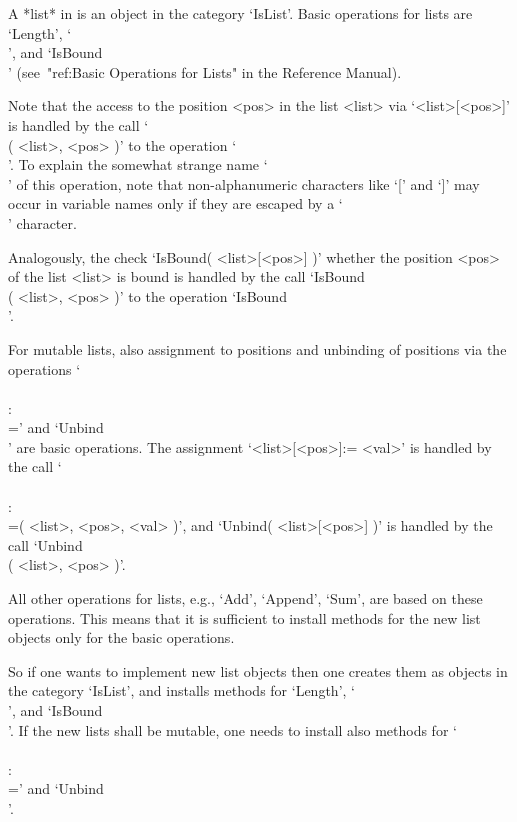 A *list* in {\GAP} is an object in the category `IsList'.
Basic operations for lists are `Length', `\\[\\]', and `IsBound\\[\\]'
(see~"ref:Basic Operations for Lists" in the Reference Manual).

Note that the access to the position <pos> in the list <list>
via `<list>[<pos>]' is handled by the call `\\[\\]( <list>, <pos> )'
to the operation `\\[\\]'.
To explain the somewhat strange name `\\[\\]' of this operation,
note that non-alphanumeric characters like `[' and `]' may occur in
{\GAP} variable names only if they are escaped by a `\\' character.

Analogously, the check `IsBound( <list>[<pos>] )' whether the position
<pos> of the list <list> is bound is handled by the call
`IsBound\\[\\]( <list>, <pos> )' to the operation
`IsBound\\[\\]'.

For mutable lists, also assignment to positions and unbinding of
positions via the operations `\\[\\]\\:\\=' and `Unbind\\[\\]'
are basic operations.
The assignment `<list>[<pos>]:= <val>' is handled by the call
`\\[\\]\\:\\=( <list>, <pos>, <val> )',
and `Unbind( <list>[<pos>] )' is handled by the call
`Unbind\\[\\]( <list>, <pos> )'.

All other operations for lists, e.g., `Add', `Append', `Sum',
are based on these operations.
This means that it is sufficient to install methods for the new list
objects only for the basic operations.

So if one wants to implement new list objects then one creates them
as objects in the category `IsList', and installs methods for `Length',
`\\[\\]', and `IsBound\\[\\]'.
If the new lists shall be mutable, one needs to install also methods
for `\\[\\]\\:\\=' and `Unbind\\[\\]'.

